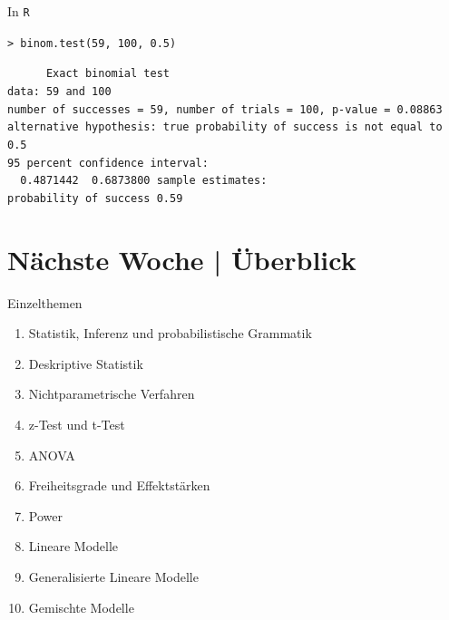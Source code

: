 \begin{frame}
  {In \texttt{R}}
  \begin{center}
    \texttt{> binom.test(59, 100, 0.5)}
  \end{center}
\tt\footnotesize
\ \ \ \ \ Exact binomial test\\[4ex]

data:  59 and 100\\
number of successes = 59, number of trials = 100, p-value = 0.08863\\
alternative hypothesis: true probability of success is not equal to 0.5\\
95 percent confidence interval:\\
\ \ 0.4871442\ \ 0.6873800
sample estimates:\\
probability of success 0.59 \\
\end{frame}


\ifdefined\TITLE
  \section{Nächste Woche | Überblick}

  \begin{frame}
    {Einzelthemen}
    \begin{enumerate}
      \item Statistik, Inferenz und probabilistische Grammatik
      \item Deskriptive Statistik
      \item Nichtparametrische Verfahren
      \item \alert{z-Test und t-Test}
      \item ANOVA
      \item Freiheitsgrade und Effektstärken
      \item Power
      \item Lineare Modelle
      \item Generalisierte Lineare Modelle
      \item Gemischte Modelle
    \end{enumerate}
  \end{frame}
\fi

